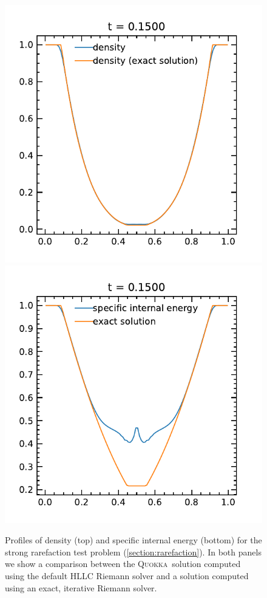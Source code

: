 \documentclass[fleqn,usenatbib]{mnras}
\newcommand{\quokka}{\textsc{Quokka}}
\begin{document}
\begin{figure}
    \includegraphics[width=\columnwidth]{hydro_vacuum_0.1500.pdf}
    \includegraphics[width=\columnwidth]{hydro_vacuum_eint_0.1500.pdf}
    \caption{Profiles of density (top) and specific internal energy (bottom) for the strong rarefaction test problem (\autoref{section:rarefaction}). In both panels we show a comparison between the \quokka~solution computed using the default HLLC Riemann solver and a solution computed using an exact, iterative Riemann solver.}
    \label{fig:vacuum}
\end{figure}
\end{document}
